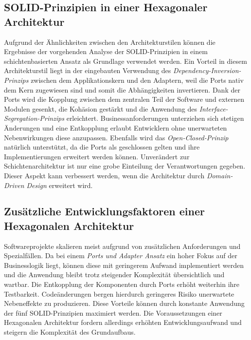 \documentclass[conference]{IEEEtran}
\begin{document}
\subsection{SOLID-Prinzipien in einer Hexagonaler Architektur}
Aufgrund der Ähnlichkeiten zwischen den Architekturstilen können die Ergebnisse der vorgehenden Analyse der SOLID-Prinzipien in einem schichtenbasierten Ansatz als Grundlage verwendet werden. Ein Vorteil in diesem Architekturstil liegt in der eingebauten Verwendung des \emph{Dependency-Inversion-Prinzips} zwischen dem Applikationskern und den Adaptern, weil die Ports nativ dem Kern zugewiesen sind und somit die Abhängigkeiten invertieren. Dank der Ports wird die Kopplung zwischen dem zentralen Teil der Software und externen Modulen gesenkt, die Kohäsion gestärkt und die Anwendung des \emph{Interface-Segregation-Prinzips} erleichtert. Businessanforderungen unterziehen sich stetigen Änderungen und eine Entkopplung erlaubt Entwicklern ohne unerwarteten Nebenwirkungen diese anzupassen. Ebenfalls wird das \emph{Open-Closed-Prinzip} natürlich unterstützt, da die Ports als geschlossen gelten und ihre Implementierungen erweitert werden können. Unverändert zur Schichtenarchitektur ist nur eine grobe Einteilung der Verantwortungen gegeben. Dieser Aspekt kann verbessert werden, wenn die Architektur durch \emph{Domain-Driven Design} erweitert wird. \cite{Vernon.2015}



\subsection{Zusätzliche Entwicklungsfaktoren einer Hexagonalen Architektur}

Softwareprojekte skalieren meist aufgrund von zusätzlichen Anforderungen und Spezialfällen. Da bei einem \emph{Ports und Adapter Ansatz} ein hoher Fokus auf der Businesslogik liegt, können diese mit geringerem Aufwand implementiert werden und die Anwendung bleibt trotz steigender Komplexität übersichtlich und wartbar. Die Entkopplung der Komponenten durch Ports erhöht weiterhin ihre Testbarkeit. Codeänderungen bergen hierdurch geringeres Risiko unerwartete Nebeneffekte zu produzieren. Diese Vorteile können durch konstante Anwendung der fünf SOLID-Prinzipien maximiert werden. Die Voraussetzungen einer Hexagonalen Architektur fordern allerdings erhöhten Entwicklungsaufwand und steigern die Komplexität des Grundaufbaus. 



\end{document}

